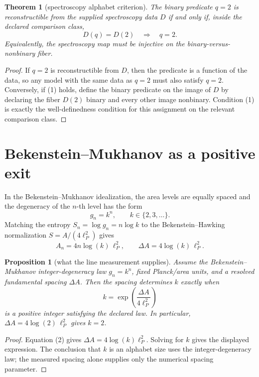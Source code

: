\documentclass[12pt]{article}
\newtheorem{theorem}{Theorem}
\newtheorem{proposition}{Proposition}
\theoremstyle{remark}
\begin{document}
\begin{theorem}[spectroscopy alphabet criterion]
\label{thm:spectral-alphabet}
The binary predicate \(q=2\) is reconstructible from the supplied spectroscopy
data \(D\) if and only if, inside the declared comparison class,
\[
  D(q)=D(2)\quad\Longrightarrow\quad q=2 .
  \tag{1}
\]
Equivalently, the spectroscopy map must be injective on the
binary-versus-nonbinary fiber.
\end{theorem}

\begin{proof}
If \(q=2\) is reconstructible from \(D\), then the predicate is a function of
the data, so any model with the same data as \(q=2\) must also satisfy
\(q=2\).  Conversely, if (1) holds, define the binary predicate on the image of
\(D\) by declaring the fiber \(D(2)\) binary and every other image nonbinary.
Condition (1) is exactly the well-definedness condition for this assignment on
the relevant comparison class.
\end{proof}

\section{Bekenstein--Mukhanov as a positive exit}

In the Bekenstein--Mukhanov idealization, the area levels are equally spaced
and the degeneracy of the \(n\)-th level has the form
\[
  g_n=k^n,\qquad k\in\{2,3,\ldots\}.
\]
Matching the entropy \(S_n=\log g_n=n\log k\) to the
Bekenstein--Hawking normalization \(S=A/(4\ell_P^2)\) gives
\[
  A_n=4n\log(k)\,\ell_P^2,
  \qquad
  \Delta A=4\log(k)\,\ell_P^2 .
  \tag{2}
\]

\begin{proposition}[what the line measurement supplies]
\label{prop:bm-positive}
Assume the Bekenstein--Mukhanov integer-degeneracy law \(g_n=k^n\), fixed
Planck/area units, and a resolved fundamental spacing \(\Delta A\).  Then the
spacing determines \(k\) exactly when
\[
  k=\exp\!\left(\frac{\Delta A}{4\ell_P^2}\right)
\]
is a positive integer satisfying the declared law.  In particular,
\(\Delta A=4\log(2)\,\ell_P^2\) gives \(k=2\).
\end{proposition}

\begin{proof}
Equation (2) gives \(\Delta A=4\log(k)\ell_P^2\).  Solving for \(k\) gives the
displayed expression.  The conclusion that \(k\) is an alphabet size uses the
integer-degeneracy law; the measured spacing alone supplies only the numerical
spacing parameter.
\end{proof}
\end{document}
